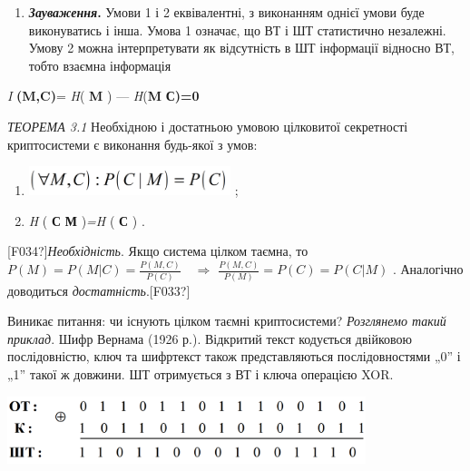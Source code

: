 \liststyleWWviiiNumxliii
\setcounter{saveenum}{\value{enumi}}
\begin{enumerate}
\setcounter{enumi}{\value{saveenum}}
\item \textbf{\textit{Зауваження}}\textbf{.} Умови 1 і 2 еквівалентні, з
виконанням  однієї умови буде виконуватись і інша. Умова 1 означає, що ВТ і ШТ
статистично незалежні. Умову 2 можна інтерпретувати як відсутність в ШТ
інформації відносно ВТ, тобто взаємна інформація  
\end{enumerate}
\textit{ } \textit{I}\textit{
}\textbf{(}\textbf{M}\textbf{,}\textbf{C}\textbf{)}=\textit{ H}( \textbf{M} ) ---
\textit{H}(\textbf{M} {\textbar} \textbf{С)=0}


\bigskip

\textit{ТЕОРЕМА 3.1 }Необхідною і достатньою умовою цілковитої секретності
криптосистеми є виконання будь-якої  з умов:

\liststyleWWviiiNumxi
\begin{enumerate}
\item 
\includegraphics[width=2.3146in,height=0.3346in]{crypt-img/crypt-img24.png} ;
\item \textit{ H }( \textbf{С}\textbf{ {\textbar} }\textbf{М} )\textit{=H }(
\textbf{С }) .
\end{enumerate}
\textlatin{[F034?]}\textit{Необхідність}. Якщо система цілком таємна, то 
${P(M)=P(M|C)=\frac{P(M,C)}{P(C)}}$  $ $ $ $ ${\Rightarrow}$ 
${\frac{P(M,C)}{P(M)}=P(C)=P(C|M)}$ .  Аналогічно доводиться
\textit{достатність}.\textlatin{[F033?]}


\bigskip

Виникає питання: чи існують цілком таємні криптосистеми? \textit{Розглянемо
такий приклад}. Шифр Вернама (1926 р.). Відкритий текст кодується двійковою
послідовністю, ключ та шифртекст  також представляються послідовностями  „0” і
„1” такої ж довжини. ШТ отримується з ВТ і ключа операцією XOR.


\bigskip

 \includegraphics[width=4.111in,height=0.778in]{crypt-img/crypt-img25.png} 


\bigskip


